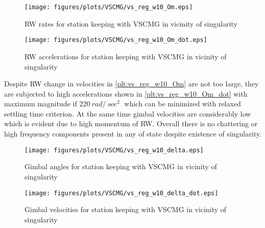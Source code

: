 \begin{figure}[H]
     \centering
    \texttt{[image: figures/plots/VSCMG/vs\_reg\_w10\_Om.eps]}
    \caption{RW rates for station keeping with VSCMG in vicinity of singularity}
    \label{plt:vs_reg_w10_Om}
\end{figure}

\begin{figure}[H]
     \centering
    \texttt{[image: figures/plots/VSCMG/vs\_reg\_w10\_Om\_dot.eps]}
    \caption{RW accelerations for station keeping with VSCMG in vicinity of singularity}
    \label{plt:vs_reg_w10_Om_dot}
\end{figure}
\noindent Despite RW change in velocities in \autoref{plt:vs_reg_w10_Om} are not too large, they are subjected to high accelerations shown in \autoref{plt:vs_reg_w10_Om_dot} with maximum magnitude if  $220\ rad/\sec^2$ which can be minimized with relaxed settling time criterion. At the same time gimbal velocities are considerably low which is evident due to high momentum of RW. Overall there is no chattering or high frequency components present in any of state despite existence of singularity.
\begin{figure}[H]
     \centering
    \texttt{[image: figures/plots/VSCMG/vs\_reg\_w10\_delta.eps]}
    \caption{Gimbal angles for station keeping with VSCMG in vicinity of singularity}
    \label{plt:vs_reg_w10_delta}
\end{figure}

\begin{figure}[H]
     \centering
    \texttt{[image: figures/plots/VSCMG/vs\_reg\_w10\_delta\_dot.eps]}
    \caption{Gimbal velocities for station keeping with VSCMG in vicinity of singularity}
    \label{plt:vs_reg_w10_delta_dot}
\end{figure}

